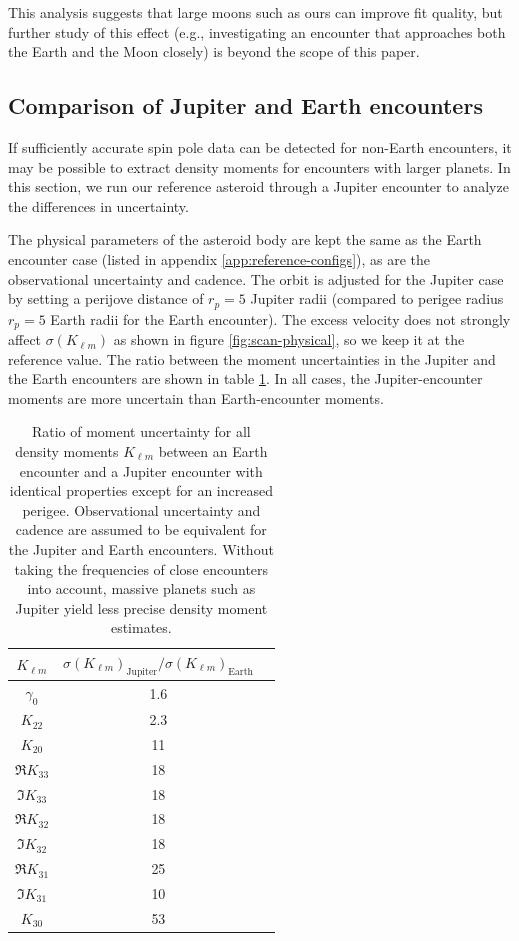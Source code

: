 \documentclass[fleqn,usenatbib]{mnras}
\begin{document}
This analysis suggests that large moons such as ours can improve fit quality, but further study of this effect (e.g., investigating an encounter that approaches both the Earth and the Moon closely) is beyond the scope of this paper.



\subsection{Comparison of Jupiter and Earth encounters}
\label{sec:jupiter-earth}

If sufficiently accurate spin pole data can be detected for non-Earth encounters, it may be possible to extract density moments for encounters with larger planets. In this section, we run our reference asteroid through a Jupiter encounter to analyze the differences in uncertainty.

The physical parameters of the asteroid body are kept the same as the Earth encounter case (listed in appendix \ref{app:reference-configs}), as are the observational uncertainty and cadence. The orbit is adjusted for the Jupiter case by setting a perijove distance of $r_p=5$ Jupiter radii (compared to perigee radius $r_p=5$ Earth radii for the Earth encounter). The excess velocity does not strongly affect $\sigma(K_{\ell m})$ as shown in figure \ref{fig:scan-physical}, so we keep it at the reference value. The ratio between the moment uncertainties in the Jupiter and the Earth encounters are shown in table \ref{tab:jupiter-uncertainty}. In all cases, the Jupiter-encounter moments are more uncertain than Earth-encounter moments.

\begin{table}
  \centering
  \begin{tabular}{c|cc}
    \hline 
    $K_{\ell m}$ & $\sigma(K_{\ell m})_\text{Jupiter}/\sigma(K_{\ell m})_\text{Earth}$\\ \hline 
    $\gamma_0$ & 1.6 \\
    $K_{22}$ & 2.3 \\
    $K_{20}$ & 11 \\
    $\Re K_{33}$ & 18 \\
    $\Im K_{33}$ & 18 \\
    $\Re K_{32}$ & 18 \\
    $\Im K_{32}$ & 18 \\
    $\Re K_{31}$ & 25 \\
    $\Im K_{31}$ & 10 \\
    $K_{30}$ & 53 \\ \hline
  \end{tabular}
  \caption{Ratio of moment uncertainty for all density moments $K_{\ell m}$ between an Earth encounter and a Jupiter encounter with identical properties except for an increased perigee. Observational uncertainty and cadence are assumed to be equivalent for the Jupiter and Earth encounters. Without taking the frequencies of close encounters into account, massive planets such as Jupiter yield less precise density moment estimates.}
  \label{tab:jupiter-uncertainty}
\end{table}
\end{document}
